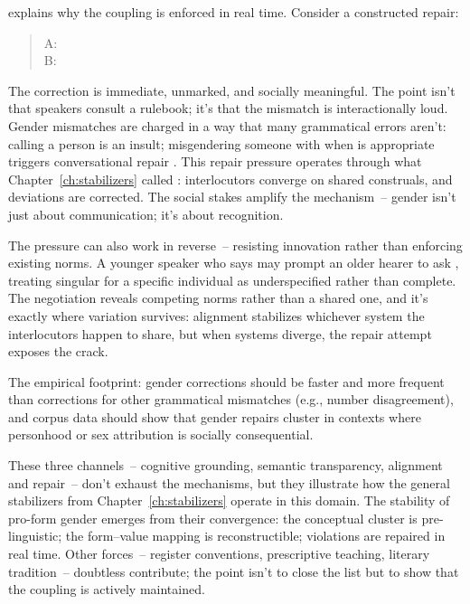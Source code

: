  explains why the coupling is enforced in real time. Consider a constructed repair:

\begin{quote}
A: \\
B: 
\end{quote}

\noindent The correction is immediate, unmarked, and socially meaningful. The point isn't that speakers consult a rulebook; it's that the mismatch is interactionally loud. Gender mismatches are charged in a way that many grammatical errors aren't: calling a person  is an insult; misgendering someone with  when  is appropriate triggers conversational repair \autocite{mcconnell-ginet2014}. This repair pressure operates through what Chapter~\ref{ch:stabilizers} called : interlocutors converge on shared construals, and deviations are corrected. The social stakes amplify the mechanism~-- gender isn't just about communication; it's about recognition.

The pressure can also work in reverse~-- resisting innovation rather than enforcing existing norms. A younger speaker who says  may prompt an older hearer to ask , treating singular  for a specific individual as underspecified rather than complete. The negotiation reveals competing norms rather than a shared one, and it's exactly where variation survives: alignment stabilizes whichever system the interlocutors happen to share, but when systems diverge, the repair attempt exposes the crack.

The empirical footprint: gender corrections should be faster and more frequent than corrections for other grammatical mismatches (e.g., number disagreement), and corpus data should show that gender repairs cluster in contexts where personhood or sex attribution is socially consequential.

These three channels~-- cognitive grounding, semantic transparency, alignment and repair~-- don't exhaust the mechanisms, but they illustrate how the general stabilizers from Chapter~\ref{ch:stabilizers} operate in this domain. The stability of pro-form gender emerges from their convergence: the conceptual cluster is pre-linguistic; the form--value mapping is reconstructible; violations are repaired in real time. Other forces~-- register conventions, prescriptive teaching, literary tradition~-- doubtless contribute; the point isn't to close the list but to show that the coupling is actively maintained.

